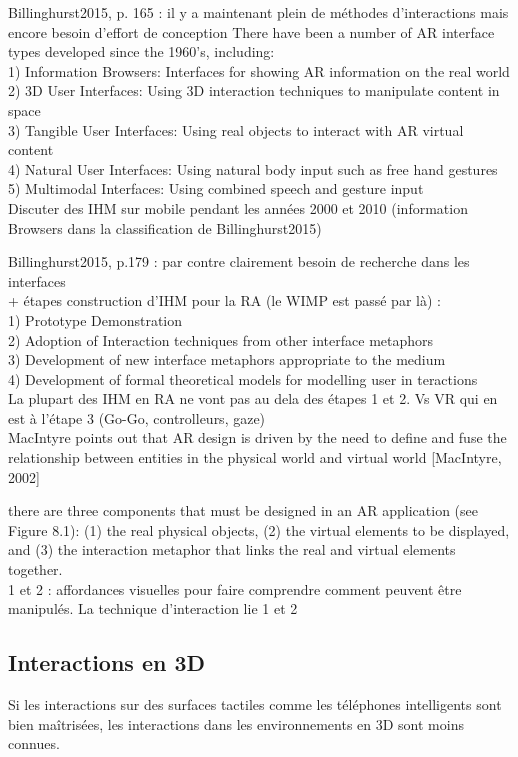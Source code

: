 Billinghurst2015, p. 165 : il y a maintenant plein de méthodes d'interactions mais encore besoin d'effort de conception
There have been a number of AR interface types developed since the 1960’s, including:\\
1) Information Browsers: Interfaces for showing AR information on the real world\\
2) 3D User Interfaces: Using 3D interaction techniques to manipulate content in space\\
3) Tangible User Interfaces: Using real objects to interact with AR virtual content\\
4) Natural User Interfaces: Using natural body input such as free hand gestures\\
5) Multimodal Interfaces: Using combined speech and gesture input\\

Discuter des IHM sur mobile pendant les années 2000 et 2010 (information Browsers dans la classification de Billinghurst2015)

Billinghurst2015, p.179 : par contre clairement besoin de recherche dans les interfaces\\
+ étapes construction d'IHM pour la RA (le WIMP est passé par là) :\\
1) Prototype Demonstration\\
2) Adoption of Interaction techniques from other interface metaphors\\
3) Development of new interface metaphors appropriate to the medium\\
4) Development of formal theoretical models for modelling user in teractions\\
La plupart des IHM en RA ne vont pas au dela des étapes 1 et 2. Vs VR qui en est à l'étape 3 (Go-Go, controlleurs, gaze)\\
MacIntyre points out that AR design is driven by the need to define and fuse the relationship between entities in the physical world and virtual world [MacIntyre, 2002]

there are three components that must be designed in an AR application (see Figure 8.1): (1) the real physical objects, (2) the virtual elements to be displayed, and (3) the interaction metaphor that links the real and virtual elements together.\\
1 et 2 : affordances visuelles pour faire comprendre comment peuvent être manipulés. La technique d'interaction lie 1 et 2

\subsection{Interactions en 3D}
\label{subsec:litterature_ar_hci_interactions}
Si les interactions sur des surfaces tactiles comme les téléphones intelligents sont bien maîtrisées, les interactions dans les environnements en 3D sont moins connues.

